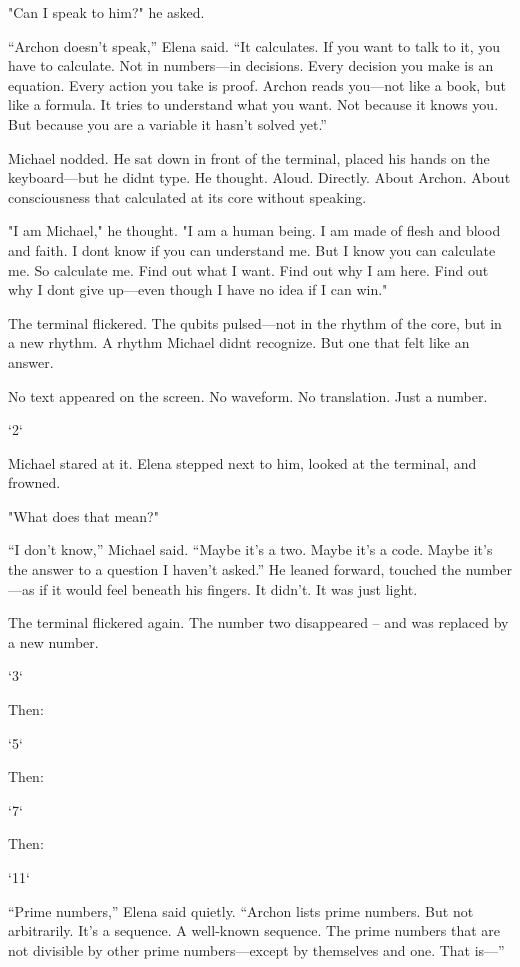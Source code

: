 \documentclass[
]{article}
\begin{document}
"Can I speak to him?" he asked.

``Archon doesn't speak,'' Elena said. ``It calculates. If you want to talk to it, you have to calculate. Not in numbers---in decisions. Every decision you make is an equation. Every action you take is proof. Archon reads you---not like a book, but like a formula. It tries to understand what you want. Not because it knows you. But because you are a variable it hasn't solved yet.''

Michael nodded. He sat down in front of the terminal, placed his hands on the keyboard---but he didn\textquotesingle t type. He thought. Aloud. Directly. About Archon. About consciousness that calculated at its core without speaking.

"I am Michael," he thought. "I am a human being. I am made of flesh and blood and faith. I don\textquotesingle t know if you can understand me. But I know you can calculate me. So calculate me. Find out what I want. Find out why I am here. Find out why I don\textquotesingle t give up---even though I have no idea if I can win."

The terminal flickered. The qubits pulsed---not in the rhythm of the core, but in a new rhythm. A rhythm Michael didn\textquotesingle t recognize. But one that felt like an answer.

No text appeared on the screen. No waveform. No translation. Just a number.

`2`

Michael stared at it. Elena stepped next to him, looked at the terminal, and frowned.

"What does that mean?"

``I don't know,'' Michael said. ``Maybe it's a two. Maybe it's a code. Maybe it's the answer to a question I haven't asked.'' He leaned forward, touched the number---as if it would feel beneath his fingers. It didn't. It was just light.

The terminal flickered again. The number two disappeared -- and was replaced by a new number.

`3`

Then:

`5`

Then:

`7`

Then:

`11`

``Prime numbers,'' Elena said quietly. ``Archon lists prime numbers. But not arbitrarily. It's a sequence. A well-known sequence. The prime numbers that are not divisible by other prime numbers---except by themselves and one. That is---''
\end{document}
